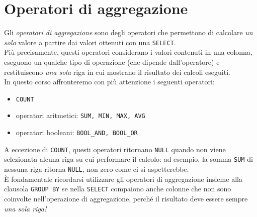 \documentclass[12pt,a4paper]{book}
\begin{document}
	\section{Operatori di aggregazione}
	Gli \textit{operatori di aggregazione} sono degli operatori che permettono di calcolare \textit{un solo} valore a partire dai valori ottenuti con una \texttt{SELECT}.\\Più precisamente, questi operatori considerano i valori contenuti in una colonna, eseguono un qualche tipo di operazione (che dipende dall'operatore) e restituiscono \textit{una sola} riga in cui mostrano il risultato dei calcoli eseguiti.\\
	In questo corso affronteremo con più attenzione i seguenti operatori:
	\begin{itemize}
		\item \texttt{COUNT}
		\item operatori aritmetici: \texttt{SUM, MIN, MAX, AVG}
		\item operatori booleani: \texttt{BOOL_AND, BOOL_OR}
	\end{itemize}
	A eccezione di \texttt{COUNT}, questi operatori ritornano \texttt{NULL} quando non viene selezionata alcuna riga su cui performare il calcolo: ad esempio, la somma \texttt{SUM} di nessuna riga ritorna \texttt{NULL}, non zero come ci si aspetterebbe.\\
	È fondamentale ricordarsi utilizzare gli operatori di aggregazione insieme alla clausola \texttt{GROUP BY} se nella \texttt{SELECT} compaiono anche colonne che non sono coinvolte nell'operazione di aggregazione, perché il risultato deve essere sempre \textit{una sola riga!} \\
\end{document}
